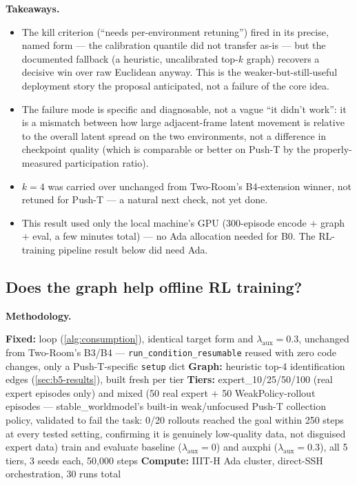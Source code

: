 \documentclass[11pt]{article}
\begin{document}
\textbf{Takeaways.}
\begin{itemize}[leftmargin=1.4em,itemsep=2pt]
\item The kill criterion (``needs per-environment retuning'') fired in its precise, named
form --- the calibration quantile did not transfer as-is --- but the documented fallback (a
heuristic, uncalibrated top-$k$ graph) recovers a decisive win over raw Euclidean anyway. This is
the weaker-but-still-useful deployment story the proposal anticipated, not a failure of the core
idea.
\item The failure mode is specific and diagnosable, not a vague ``it didn't work'': it is a
mismatch between how large adjacent-frame latent movement is relative to the overall latent
spread on the two environments, not a difference in checkpoint quality (which is comparable or
better on Push-T by the properly-measured participation ratio).
\item $k=4$ was carried over unchanged from Two-Room's B4-extension winner, not retuned for
Push-T --- a natural next check, not yet done.
\item This result used only the local machine's GPU (300-episode encode $+$ graph $+$ eval, a
few minutes total) --- no Ada allocation needed for B0. The RL-training pipeline result below
did need Ada.
\end{itemize}

\subsection{Does the graph help offline RL training?}
\label{sec:b5-b3-results}

\textbf{Methodology.}

\begin{algorithm}[H]
\caption{Push-T RL-training methodology --- Two-Room's B3 data-tier sweep, ported to Push-T}
\begin{algorithmic}[1]
\State \textbf{Fixed:}  loop (\cref{alg:consumption}), identical target form and $\lambda_{\text{aux}}=0.3$, unchanged from Two-Room's B3/B4 --- \texttt{run\_condition\_resumable} reused with zero code changes, only a Push-T-specific \texttt{setup} dict
\State \textbf{Graph:} heuristic top-4 identification edges (\cref{sec:b5-results}), built fresh per tier
\State \textbf{Tiers:} expert\_10/25/50/100 (real expert episodes only) and mixed (50 real expert $+$ 50 WeakPolicy-rollout episodes --- stable\_worldmodel's built-in weak/unfocused Push-T collection policy, validated to fail the task: 0/20 rollouts reached the goal within 250 steps at every tested setting, confirming it is genuinely low-quality data, not disguised expert data)
\State train and evaluate baseline ($\lambda_{\text{aux}}=0$) and auxphi ($\lambda_{\text{aux}}=0.3$), all 5 tiers, 3 seeds each, 50{,}000 steps
\State \textbf{Compute:} IIIT-H Ada cluster, direct-SSH orchestration, 30 runs total
\end{algorithmic}
\end{algorithm}
\end{document}
